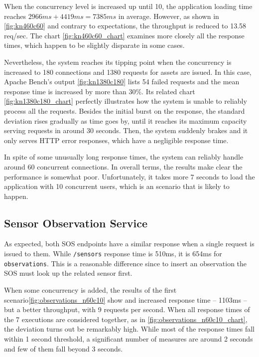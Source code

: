 When the concurrency level is increased up until 10, the application loading time reaches $2966ms + 4419ms = 7385ms$ in average. However, as shown in \ref{fig:kn460c60} and contrary to expectations, the throughput is reduced to 13.58 req/sec. The chart \ref{fig:kn460c60_chart} examines more closely all the response times, which happen to be slightly disparate in some cases.

Nevertheless, the system reaches its tipping point when the concurrency is increased to 180 connections and 1380 requests for assets are issued. In this case, Apache Bench's output \ref{fig:kn1380c180} lists 54 failed requests and the mean response time is increased by more than 30\%. Its related chart \ref{fig:kn1380c180_chart} perfectly illustrates how the system is unable to reliably process all the requests. Besides the initial burst on the response, the standard deviation rises gradually as time goes by, until it reaches its maximum capacity serving requests in around 30 seconds. Then, the system suddenly brakes and it only serves HTTP error responses, which have a negligible response time.

In spite of some unusually long response times, the system can reliably handle around 60 concurrent connections. In overall terms, the results make clear the performance is somewhat poor. Unfortunately, it takes more 7 seconds to load the application with 10 concurrent users, which is an scenario that is likely to happen.

\subsection*{Sensor Observation Service}

As expected, both SOS endpoints have a similar response when a single request is issued to them. While \texttt{/sensors} response time is 510ms, it is 654ms for \texttt{observations}. This is a reasonable difference since to insert an observation the SOS must look up the related sensor first.

When some concurrency is added, the results of the first scenario\ref{fig:observations_n60c10} show and increased response time -- 1103ms -- but a better throughput, with 9 requests per second. When all response times of the 7 executions are considered together, as in \ref{fig:observations_n60c10_chart}, the deviation turns out be remarkably high. While most of the response times fall within 1 second threshold, a significant number of measures are around 2 seconds and few of them fall beyond 3 seconds.

